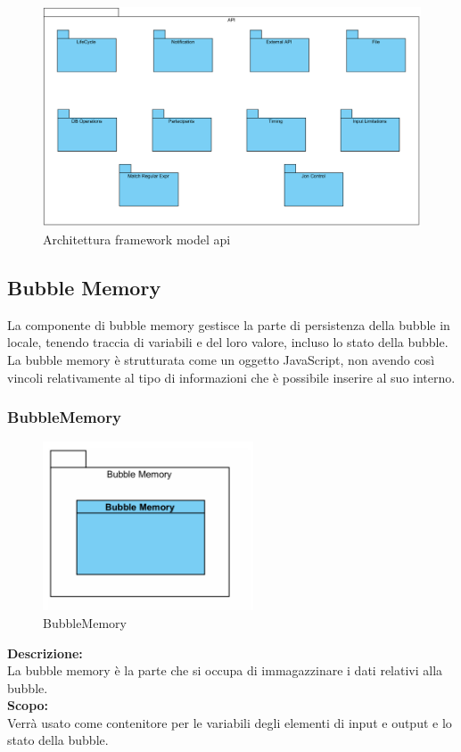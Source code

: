 \begin{figure}[H]
	\centering
	\includegraphics[width=14cm]{diagrammi_img/classi_e_package/framework_api_package.png}
	\caption{Architettura framework model api}
\end{figure}

\subsection{Bubble Memory}
La componente di bubble memory gestisce la parte di persistenza della bubble in locale, tenendo traccia di variabili e del loro valore, incluso lo stato della bubble. La bubble memory è strutturata come un oggetto JavaScript, non avendo così vincoli relativamente al tipo di informazioni che è possibile inserire al suo interno.

\subsubsection{BubbleMemory}\label{fm-memory}
\nopagebreak
\begin{figure}[H]
	\centering
	\includegraphics[height=5cm]{diagrammi_img/classi_e_package/bubble_memory.png}
	\caption{BubbleMemory}
\end{figure}	
\textbf{Descrizione:}\\
La bubble memory è la parte che si occupa di immagazzinare i dati relativi alla bubble. \\
\textbf{Scopo:}\\
Verrà usato come contenitore per le variabili degli elementi di input e output e lo stato della bubble.

